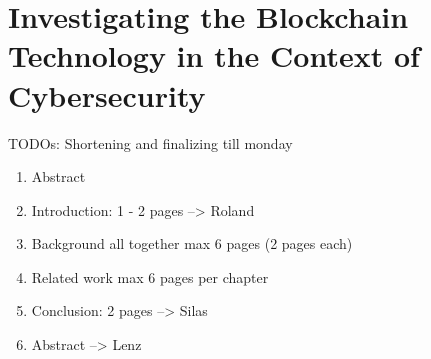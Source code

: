 \chapter{Investigating the Blockchain Technology
in the Context of Cybersecurity}




TODOs:
Shortening and finalizing till monday
\begin{enumerate}
	\item Abstract
	\item Introduction: 1 - 2 pages --> Roland
	\item Background all together max 6 pages (2 pages each)
	\item Related work max 6 pages per chapter
	\item Conclusion: 2 pages --> Silas
	\item Abstract --> Lenz
\end{enumerate}


\newpage

\minitoc %

\newpage


\newpage


\newpage


\newpage



\nocite{*}


